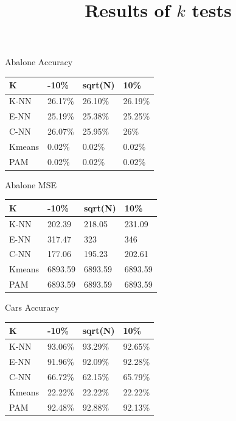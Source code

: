 \documentclass[twoside,11pt]{article}
\begin{document}
\begin{table}[h]
	\title{Results of $k$ tests}
	\begin{minipage}[b]{0.45\linewidth}\centering
		Abalone Accuracy
		\begin{tabular}{llll}
			\hline
			K      & -10\%   & sqrt(N) & 10\%    \\ \hline
			K-NN   & 26.17\% & 26.10\% & 26.19\% \\
			E-NN   & 25.19\% & 25.38\% & 25.25\% \\
			C-NN   & 26.07\% & 25.95\% & 26\%    \\
			Kmeans & 0.02\%  & 0.02\%  & 0.02\%  \\
			PAM    & 0.02\%  & 0.02\%  & 0.02\%
		\end{tabular}
	\end{minipage}
	\hspace{0.5cm}\centering
	\begin{minipage}[b]{0.45\linewidth}
		Abalone MSE
		\centering
		\begin{tabular}{llll}
			\hline
			K      & -10\%   & sqrt(N) & 10\%    \\ \hline
			K-NN   & 202.39  & 218.05  & 231.09  \\
			E-NN   & 317.47  & 323     & 346     \\
			C-NN   & 177.06  & 195.23  & 202.61  \\
			Kmeans & 6893.59 & 6893.59 & 6893.59 \\
			PAM    & 6893.59 & 6893.59 & 6893.59
		\end{tabular}
	\end{minipage}
	\begin{minipage}[b]{0.45\linewidth}\centering
		Cars Accuracy
		\begin{tabular}{llll}
			\hline
			K      & -10\%   & sqrt(N) & 10\%    \\ \hline
			K-NN   & 93.06\% & 93.29\% & 92.65\% \\
			E-NN   & 91.96\% & 92.09\% & 92.28\% \\
			C-NN   & 66.72\% & 62.15\% & 65.79\% \\
			Kmeans & 22.22\% & 22.22\% & 22.22\% \\
			PAM    & 92.48\% & 92.88\% & 92.13\%
		\end{tabular}
	\end{minipage}
	\hspace{0.5cm}\centering
	\begin{minipage}[b]{0.45\linewidth}

\end{minipage}
\end{table}
\end{document}
